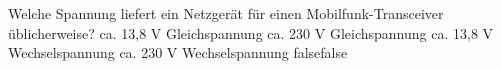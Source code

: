     {Welche Spannung liefert ein Netzgerät für einen Mobilfunk-Transceiver üblicherweise?}
    {ca. 13,8 V Gleichspannung}
    {ca. 230 V Gleichspannung}
    {ca. 13,8 V Wechselspannung}
    {ca. 230 V Wechselspannung}
    {false}{false}